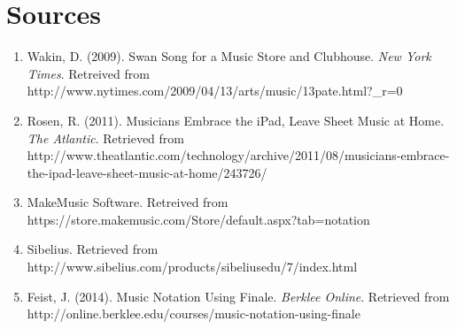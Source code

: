 \documentclass[12pt]{article}
\begin{document}
\section{Sources}
\begin{enumerate}
\item Wakin, D.  (2009).  Swan Song for a Music Store and Clubhouse.  \emph{New York Times}.  Retreived from http://www.nytimes.com/2009/04/13/arts/music/13pate.html?\_r=0
\item Rosen, R.  (2011).  Musicians Embrace the iPad, Leave Sheet Music at Home.  \emph{The Atlantic}.  Retrieved from http://www.theatlantic.com/technology/archive/2011/08/musicians-embrace-the-ipad-leave-sheet-music-at-home/243726/
\item MakeMusic Software.  Retreived from https://store.makemusic.com/Store/default.aspx?tab=notation
\item Sibelius.  Retrieved from http://www.sibelius.com/products/sibeliusedu/7/index.html
\item Feist, J.  (2014).  Music Notation Using Finale.  \emph{Berklee Online}.  Retrieved from http://online.berklee.edu/courses/music-notation-using-finale
\end{enumerate}
\end{document}
